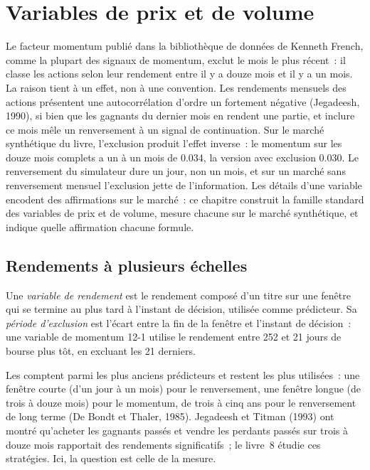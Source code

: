 \chapter{Variables de prix et de volume}\label{ch:rs:price-and-volume-features}

Le facteur momentum publié dans la bibliothèque de données de Kenneth French, comme la plupart des signaux de momentum, exclut le mois le plus récent~: il
classe les actions selon leur rendement entre il y a douze mois et il y a un mois. La raison tient à un effet, non à une convention. Les rendements mensuels des actions présentent une autocorrélation
d'ordre un fortement négative (Jegadeesh, 1990), si bien que les gagnants du dernier mois en rendent une partie, et inclure ce
mois mêle un renversement à un signal de continuation. Sur le marché synthétique du livre, l'exclusion produit l'effet inverse~: le momentum sur
les douze mois complets a un  à un mois de 0.034, la version avec exclusion 0.030. Le renversement du simulateur
dure un jour, non un mois, et sur un marché sans renversement mensuel l'exclusion jette de l'information. Les détails
d'une variable encodent des affirmations sur le marché~: ce chapitre construit la famille standard des variables de prix et de volume, mesure chacune
sur le marché synthétique, et indique quelle affirmation chacune formule.

\section{Rendements à plusieurs échelles}

\begin{definition}\label{def:rs:price-and-volume-features:return}
Une \emph{variable de rendement} est le rendement composé d'un titre sur une fenêtre qui se termine au plus tard
à l'instant de décision, utilisée comme prédicteur. Sa \emph{période d'exclusion} est l'écart entre la fin de la fenêtre et l'instant de décision~:
une variable de momentum 12-1 utilise le rendement entre 252 et 21 jours de bourse plus tôt, en excluant les 21 derniers.
\end{definition}

Les  comptent parmi les plus anciens prédicteurs et restent les plus utilisées~: une fenêtre courte (d'un jour à un mois) pour le renversement, une fenêtre longue
(de trois à douze mois) pour le momentum, de trois à cinq ans pour le renversement de long terme (De Bondt et Thaler, 1985). Jegadeesh et Titman
(1993) ont montré qu'acheter les gagnants passés et vendre les perdants passés sur trois à douze mois rapportait des rendements significatifs~; le livre~8
étudie ces stratégies. Ici, la question est celle de la mesure.

